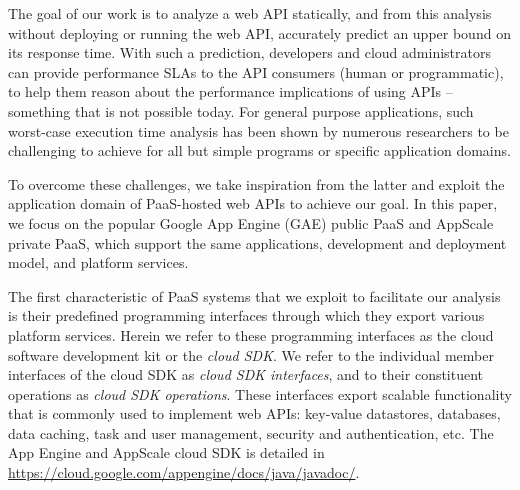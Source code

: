 The goal of our work is to analyze a web API statically, and from this analysis 
without deploying or running the web API, 
accurately predict an upper bound on its response time. With such a prediction,
developers and cloud administrators can provide performance SLAs to the API consumers (human or 
programmatic), to help them reason about 
the performance implications of using APIs -- something that is not possible today.
For general purpose applications, such worst-case execution time analysis has been shown
by numerous researchers to be challenging to achieve for all but 
simple programs or specific application domains.

To overcome these challenges, we take inspiration from the latter and exploit 
the application domain of PaaS-hosted web APIs to achieve our goal.  
In this paper, we focus on the popular Google App Engine (GAE) public PaaS 
and AppScale private PaaS, which support the same applications, 
development and deployment model, and platform services.

The first characteristic of PaaS systems
that we exploit to facilitate our analysis 
is their predefined programming interfaces 
through which they export various platform services. 
Herein we refer to these programming interfaces as the cloud software development 
kit or the \textit{cloud SDK}. We refer to the individual member interfaces of the cloud SDK
as \textit{cloud SDK interfaces}, and to their constituent operations 
as \textit{cloud SDK operations}.  These interfaces export scalable
functionality that is commonly used to implement web APIs:  
key-value datastores, databases,
data caching, task and user management, security and authentication, etc.
The App Engine and AppScale cloud SDK is detailed 
in \url{https://cloud.google.com/appengine/docs/java/javadoc/}. 


